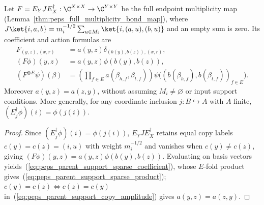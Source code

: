\begin{lemma}%
    \label{thm:peps_parent_support_sparse_action}
    \leanok
    Let $F=E_YJE_X^\dagger:\C^{X\times X}\to\C^{Y\times Y}$
    be the full endpoint multiplicity map (Lemma~\ref{thm:peps_full_multiplicity_bond_map}), where
    $J\ket{i,a,b}=m_i^{-1/2}\sum_{u\in M_i}\ket{i,(a,u),(b,u)}$
    and an empty sum is zero. Its coefficient and action formulas are
    \begin{align}
        F_{(y,z),(x,r)} & =a(y,z)\delta_{(b(y),b(z)),(x,r)},
        \label{eq:peps_parent_support_sparse_coefficient}                        \\
        (F\phi)(y,z)    & =a(y,z)\phi(b(y),b(z)),                                \\
        (F^{\otimes E}\psi)(\beta)
                        & =\left(\prod_{f\in E}a(\beta_{h,f},\beta_{t,f})\right)
        \psi\bigl((b(\beta_{h,f}),b(\beta_{t,f}))_{f\in E}\bigr).
        \label{eq:peps_parent_support_sparse_product}
    \end{align}
    Moreover $a(y,z)=a(z,y)$, without assuming $M_i\ne\varnothing$ or input
    support conditions. More generally, for any coordinate inclusion
    $j:B\hookrightarrow A$ with $A$ finite, $(E_j^\dagger\phi)(i)=\phi(j(i))$.
\end{lemma}
\begin{proof}\leanok
    Since $(E_j^\dagger\phi)(i)=\phi(j(i))$, $E_YJE_X^\dagger$ retains equal
    copy labels $c(y)=c(z)=(i,u)$ with weight $m_i^{-1/2}$ and vanishes when
    $c(y)\ne c(z)$, giving $(F\phi)(y,z)=a(y,z)\phi(b(y),b(z))$. Evaluating on
    basis vectors yields~(\ref{eq:peps_parent_support_sparse_coefficient}),
    whose $E$-fold product gives~(\ref{eq:peps_parent_support_sparse_product});
    $c(y)=c(z)\iff c(z)=c(y)$ in~(\ref{eq:peps_parent_support_copy_amplitude})
    gives $a(y,z)=a(z,y)$.
\end{proof}

